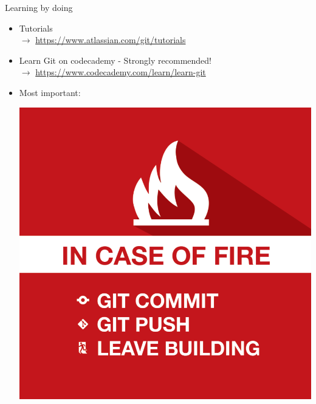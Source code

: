 \documentclass[10pt,xcolor=dvipsnames]{beamer}
\begin{document}
\begin{frame}{Learning by doing}
\begin{itemize}
  \setlength\itemsep{0.2in}
\item Tutorials  \\$\rightarrow$  \url{https://www.atlassian.com/git/tutorials}
\item Learn Git on codecademy - Strongly recommended!\\ $\rightarrow$ \url{https://www.codecademy.com/learn/learn-git}
\item Most important:
\begin{center}
\includegraphics[height=0.3\textheight]{fire-git.png}
\end{center}
\end{itemize}
\end{frame}
\end{document}
